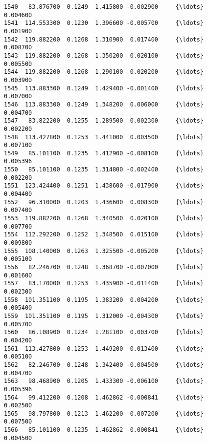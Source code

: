 \documentclass[11pt]{article}
\begin{document}
\begin{Verbatim}[commandchars=\\\{\}]
1540   83.876700  0.1249  1.415800 -0.002900     {\ldots}      0.004600   
1541  114.553300  0.1230  1.396600 -0.005700     {\ldots}      0.001900   
1542  119.882200  0.1268  1.310900  0.017400     {\ldots}      0.008700   
1543  119.882200  0.1268  1.350200  0.020100     {\ldots}      0.005500   
1544  119.882200  0.1268  1.290100  0.020200     {\ldots}      0.003900   
1545  113.883300  0.1249  1.429400 -0.001400     {\ldots}      0.007000   
1546  113.883300  0.1249  1.348200  0.006000     {\ldots}      0.004700   
1547   83.822200  0.1255  1.289500  0.002300     {\ldots}      0.002200   
1548  113.427800  0.1253  1.441000  0.003500     {\ldots}      0.007100   
1549   85.101100  0.1235  1.412900 -0.008100     {\ldots}      0.005396   
1550   85.101100  0.1235  1.314800 -0.002400     {\ldots}      0.002200   
1551  123.424400  0.1251  1.438600 -0.017900     {\ldots}      0.004400   
1552   96.310000  0.1203  1.436600  0.008300     {\ldots}      0.007400   
1553  119.882200  0.1268  1.340500  0.020100     {\ldots}      0.007700   
1554  112.292200  0.1252  1.348500  0.015100     {\ldots}      0.009800   
1555  108.140000  0.1263  1.325500 -0.005200     {\ldots}      0.005100   
1556   82.246700  0.1248  1.368700 -0.007000     {\ldots}      0.001600   
1557   83.170000  0.1253  1.435900 -0.011400     {\ldots}      0.002300   
1558  101.351100  0.1195  1.383200  0.004200     {\ldots}      0.005400   
1559  101.351100  0.1195  1.312000 -0.004300     {\ldots}      0.005700   
1560   86.108900  0.1234  1.281100  0.003700     {\ldots}      0.004200   
1561  113.427800  0.1253  1.449200 -0.013400     {\ldots}      0.005100   
1562   82.246700  0.1248  1.342400 -0.004500     {\ldots}      0.004700   
1563   98.468900  0.1205  1.433300 -0.006100     {\ldots}      0.005396   
1564   99.412200  0.1208  1.462862 -0.000841     {\ldots}      0.002500   
1565   98.797800  0.1213  1.462200 -0.007200     {\ldots}      0.007500   
1566   85.101100  0.1235  1.462862 -0.000841     {\ldots}      0.004500   


\end{Verbatim}
\end{document}
